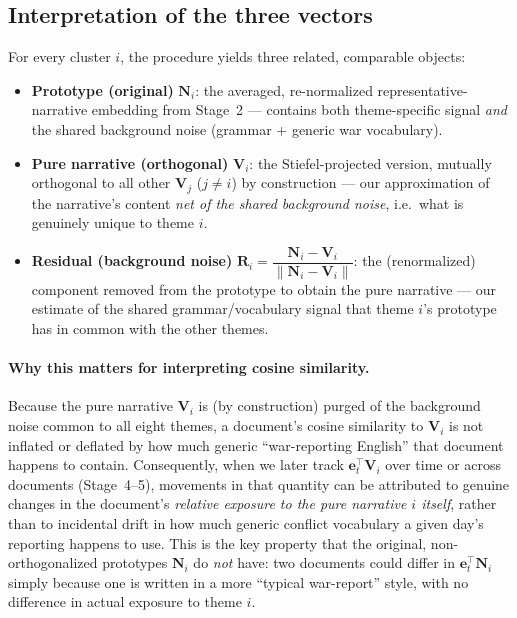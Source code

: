 \documentclass[11pt]{article}
\begin{document}
\subsection{Interpretation of the three vectors}
\label{sec:interpretation}
For every cluster $i$, the procedure yields three related, comparable objects:
\begin{itemize}
    \item \textbf{Prototype (original)} $\mathbf{N}_i$: the averaged, re-normalized representative-narrative embedding from Stage~2 --- contains both theme-specific signal \emph{and} the shared background noise (grammar + generic war vocabulary).
    \item \textbf{Pure narrative (orthogonal)} $\mathbf{V}_i$: the Stiefel-projected version, mutually orthogonal to all other $\mathbf{V}_j$ ($j \ne i$) by construction --- our approximation of the narrative's content \emph{net of the shared background noise}, i.e.\ what is genuinely unique to theme $i$.
    \item \textbf{Residual (background noise)} $\mathbf{R}_i = \dfrac{\mathbf{N}_i - \mathbf{V}_i}{\lVert \mathbf{N}_i - \mathbf{V}_i \rVert}$: the (renormalized) component removed from the prototype to obtain the pure narrative --- our estimate of the shared grammar/vocabulary signal that theme $i$'s prototype has in common with the other themes.
\end{itemize}

\paragraph{Why this matters for interpreting cosine similarity.} Because the
pure narrative $\mathbf{V}_i$ is (by construction) purged of the background
noise common to all eight themes, a document's cosine similarity to
$\mathbf{V}_i$ is not inflated or deflated by how much generic
``war-reporting English'' that document happens to contain. Consequently,
when we later track $\mathbf{e}_t^\top \mathbf{V}_i$ over time or across
documents (Stage~4--5), movements in that quantity can be attributed to
genuine changes in the document's \emph{relative exposure to the pure
narrative $i$ itself}, rather than to incidental drift in how much generic
conflict vocabulary a given day's reporting happens to use. This is the
key property that the original, non-orthogonalized prototypes $\mathbf{N}_i$
do \emph{not} have: two documents could differ in $\mathbf{e}_t^\top
\mathbf{N}_i$ simply because one is written in a more ``typical war-report''
style, with no difference in actual exposure to theme $i$.
\end{document}
